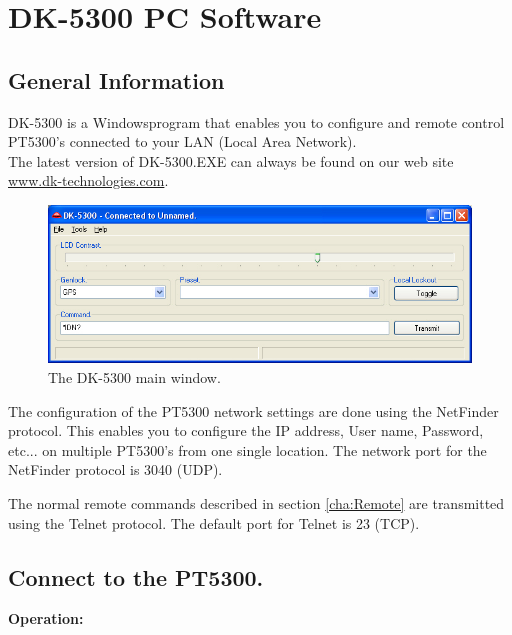 \section{DK-5300 PC Software}
\label{cha:DK5300}

\subsection{General Information}
DK-5300 is a Windows\registeredtm program that enables you to configure and remote control PT5300's connected to your LAN (Local Area Network).\\
The latest version of DK-5300.EXE can always be found on our web site \href{http://www.dk-technologies.com}{www.dk-technologies.com}.\\

\begin{figure}[hbt]
\centering
\includegraphics[width=1\textwidth]{fig/DK5300_MainWindow}
\caption{The DK-5300 main window.\label{fig:DK5300MainWindow}}
\end{figure}

The configuration of the PT5300 network settings are done using the NetFinder protocol. This enables you to configure the IP address, User name, Password, etc... on multiple PT5300's from one single location. The network port for the NetFinder protocol is 3040 (UDP).

The normal remote commands described in section \ref{cha:Remote} are transmitted using the Telnet protocol. The default port for Telnet is 23 (TCP).\\
\PasswordWarning
\newpage
\subsection{Connect to the PT5300.}
\label{cha:DK5300Connect}
\textbf{Operation:}

